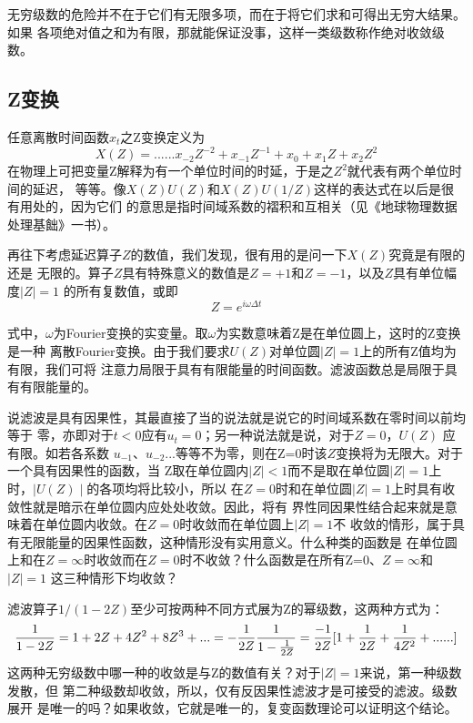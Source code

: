 无穷级数的危险并不在于它们有无限多项，而在于将它们求和可得出无穷大结果。如果
各项绝对值之和为有限，那就能保证没事，这样一类级数称作绝对收敛级数。

\subsection{Z变换}
\label{sec:4.6.2}


任意离散时间函数$x_t$之Z变换定义为
\begin{equation}
X(Z)=......x_{-2}Z^{-2}+x_{-1}Z^{-1}+x_0+x_1Z+x_2Z^2
\label{eq:ex4.6.1}
\end{equation}
在物理上可把变量Z解释为有一个单位时间的时延，于是之$Z^2$就代表有两个单位时间的延迟，
等等。像$X(Z)U(Z)$和$X(Z)U(1/Z)$这样的表达式在以后是很有用处的，因为它们
的意思是指时间域系数的褶积和互相关（见《地球物理数据处理基飿》一书）。

再往下考虑延迟算子$Z$的数值，我们发现，很有用的是问一下$X(Z)$究竟是有限的还是
无限的。算子$Z$具有特殊意义的数值是$Z=+1$和$Z=-1$，以及$Z$具有单位幅度$\mid Z\mid =1$
的所有复数值，或即
\begin{equation}
Z=e^{i\omega \Delta t}
\label{eq:ex4.6.2}
\end{equation}

式中，$\omega$为Fourier变换的实变量。取$\omega$为实数意味着Z是在单位圆上，这时的Z变换是一种
离散Fourier变换。由于我们要求$U(Z)$对单位圆$\mid Z\mid=1$上的所有Z值均为有限，我们可将
注意力局限于具有有限能量的时间函数。滤波函数总是局限于具有有限能量的。

说滤波是具有因果性，其最直接了当的说法就是说它的时间域系数在零时间以前均等于
零，亦即对于$t<0$应有$u_t=0$；另一种说法就是说，对于$Z=0$，$U(Z)$
应有限。如若各系数
$u_{-1}$、$u_{-2}$...等等不为零，则在Z=0时该$Z$变换将为无限大。对于一个具有因果性的函数，当
Z取在单位圆内$\mid Z\mid<1$而不是取在单位圆$\mid Z\mid=1$上时，$\mid U(Z)\mid$的各项均将比较小，所以
在$Z=0$时和在单位圆$\mid Z\mid=1$上时具有收敛性就是暗示在单位圆内应处处收敛。因此，将有
界性同因果性结合起来就是意味着在单位圆内收敛。在$Z=0$时收敛而在单位圆上$\mid Z\mid=1$不
收敛的情形，属于具有无限能量的因果性函数，这种情形没有实用意义。什么种类的函数是
在单位圆上和在$Z=\infty$时收敛而在$Z=0$时不收敛？什么函数是在所有Z=0、$Z=\infty$和$\mid Z\mid=1$
这三种情形下均收敛？

滤波算子$1/(1-2Z)$至少可按两种不同方式展为Z的幂级数，这两种方式为：
\begin{equation}
\frac{1}{1-2Z}=1+2Z+4Z^2+8Z^3+...\\
=-\frac{1}{2Z}\frac{1}{1-\frac{1}{2Z}}=\frac{-1}{2Z}[1+\frac{1}{2Z}+\frac{1}{4Z^2}+......]
\label{eq:4.6.3}
\end{equation}
这两种无穷级数中哪一种的收敛是与Z的数值有关？对于$\mid Z\mid=1$来说，第一种级数发散，但
第二种级数却收敛，所以，仅有反因果性滤波才是可接受的滤波。级数展开
是唯一的吗？如果收敛，它就是唯一的，复变函数理论可以证明这个结论。


